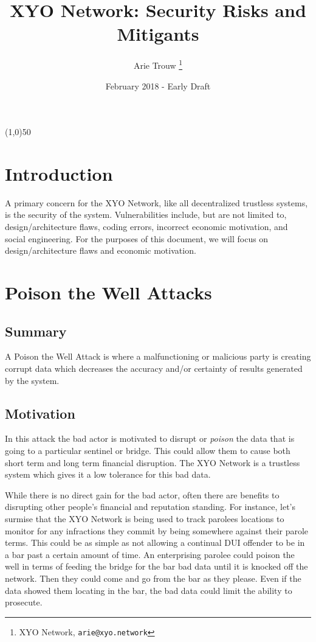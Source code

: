 \documentclass{article}
\title {XYO Network: Security Risks and Mitigants}
\author{
    Arie Trouw
        \thanks{XYO Network, \texttt{arie@xyo.network}}
}
\date{February 2018 - Early Draft}
\begin{document}
\pagecolor{lightred}

\maketitle

\begin{center}
\line(1,0){50}
\end{center}

\section{Introduction}
A primary concern for the XYO Network, like all decentralized trustless systems, is the security of the system.  Vulnerabilities include, but are not limited to, design/architecture flaws, coding errors, incorrect economic motivation, and social engineering. For the purposes of this document, we will focus on design/architecture flaws and economic motivation.

\section{Poison the Well Attacks}
\subsection{Summary}
A Poison the Well Attack is where a malfunctioning or malicious party is creating corrupt data which decreases the accuracy and/or certainty of results generated by the system.

\subsection{Motivation}
In this attack the bad actor is motivated to disrupt or \emph{poison} the data that is going to a particular \gls{sentinel} or \gls{bridge}. This could allow them to cause both short term and long term financial disruption. The XYO Network is a trustless system which gives it a low tolerance for this bad data. 

While there is no direct gain for the bad actor, often there are benefits to disrupting other people's financial and reputation standing. For instance, let's surmise that the XYO Network is being used to track parolees locations to monitor for any infractions they commit by being somewhere against their parole terms. This could be as simple as not allowing a continual DUI offender to be in a bar past a certain amount of time. An enterprising parolee could poison the well in terms of feeding the bridge for the bar bad data until it is knocked off the network. Then they could come and go from the bar as they please. Even if the data showed them locating in the bar, the bad data could limit the ability to prosecute.
\end{document}
